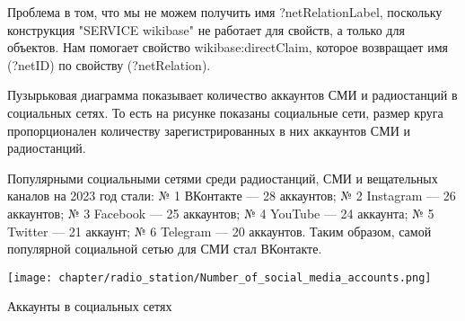 Проблема в том, что мы не можем получить имя ?netRelationLabel, поскольку конструкция "SERVICE wikibase" не работает для свойств, а только для объектов. Нам помогает свойство wikibase:directClaim, которое возвращает имя (?netID) по свойству (?netRelation).

\newpage

Пузырьковая диаграмма показывает количество аккаунтов СМИ и радиостанций в социальных сетях. То есть на рисунке показаны социальные сети, размер круга пропорционален количеству зарегистрированных в них аккаунтов СМИ и радиостанций.

Популярными социальными сетями среди радиостанций, СМИ и вещательных каналов на 2023 год стали: № 1 ВКонтакте — 28 аккаунтов; № 2 Instagram — 26 аккаунтов; № 3 Facebook — 25 аккаунтов; № 4 YouTube — 24 аккаунта; № 5 Twitter — 21 аккаунт; № 6 Telegram — 20 аккаунтов. Таким образом, самой популярной социальной сетью для СМИ стал ВКонтакте.

\begin{marginfigure}[1\baselineskip]
{\texttt{[image: chapter/radio\_station/Number\_of\_social\_media\_accounts.png]}}
\vspace{-7pt}
\caption{Аккаунты в социальных сетях}%
\label{fig:radio_station_acc}
\end{marginfigure}

%
